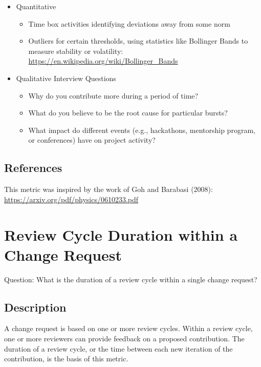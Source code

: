 \documentclass[
  12pt,
]{article}
\providecommand{\tightlist}{%
  \setlength{\itemsep}{0pt}\setlength{\parskip}{0pt}}
\begin{document}
\begin{itemize}
\tightlist
\item
  Quantitative

  \begin{itemize}
  \tightlist
  \item
    Time box activities identifying deviations away from some norm
  \item
    Outliers for certain thresholds, using statistics like Bollinger
    Bands to measure stability or volatility:
    \url{https://en.wikipedia.org/wiki/Bollinger_Bands}
  \end{itemize}
\item
  Qualitative Interview Questions

  \begin{itemize}
  \tightlist
  \item
    Why do you contribute more during a period of time?
  \item
    What do you believe to be the root cause for particular bursts?
  \item
    What impact do different events (e.g., hackathons, mentorship
    program, or conferences) have on project activity?
  \end{itemize}
\end{itemize}

\hypertarget{references-3}{%
\subsection{References}\label{references-3}}

This metric was inspired by the work of Goh and Barabasi (2008):
\url{https://arxiv.org/pdf/physics/0610233.pdf}

\hypertarget{review-cycle-duration-within-a-change-request}{%
\section{Review Cycle Duration within a Change
Request}\label{review-cycle-duration-within-a-change-request}}

Question: What is the duration of a review cycle within a single change
request?

\hypertarget{description-4}{%
\subsection{Description}\label{description-4}}

A change request is based on one or more review cycles. Within a review
cycle, one or more reviewers can provide feedback on a proposed
contribution. The duration of a review cycle, or the time between each
new iteration of the contribution, is the basis of this metric.
\end{document}
